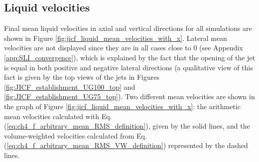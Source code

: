 \clearpage

%
%
%
%	
%	
%

\subsection{Liquid velocities}

Final mean liquid velocities in axial and vertical directions for all simulations are shown in Figure \ref{fig:jicf_liquid_mean_velocities_with_x}. Lateral mean velocities are not displayed since they are in all cases close to 0 (see Appendix \ref{app:SLI_convergence}), which is explained by the fact that the opening of the jet is equal in both positive and negative lateral directions (a qualitative view of this fact is given by the top views of the jets in Figures \ref{fig:JICF_establishment_UG100_top} and \ref{fig:JICF_establishment_UG75_top}). Two different mean velocities are shown in the graph of Figure \ref{fig:jicf_liquid_mean_velocities_with_x}: the arithmetic mean velocities calculated with Eq. (\ref{eq:ch4_f_arbitrary_mean_RMS_definition}), given by the solid lines, and the volume-weighted velocities calculated from Eq. (\ref{eq:ch4_f_arbitrary_mean_RMS_VW_definition}) represented by the dashed lines.

